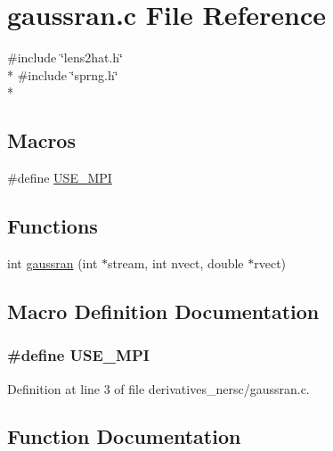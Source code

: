 \section{gaussran.\-c File Reference}
\label{derivatives__nersc_2gaussran_8c}
{\ttfamily \#include \char`\"{}lens2hat.\-h\char`\"{}}\\*
{\ttfamily \#include \char`\"{}sprng.\-h\char`\"{}}\\*
\subsection*{Macros}
\begin{DoxyCompactItemize}
\item 
\#define \hyperlink{derivatives__nersc_2gaussran_8c_a3869d282031f6ea6b50fdb980b758420}{U\-S\-E\-\_\-\-M\-P\-I}
\end{DoxyCompactItemize}
\subsection*{Functions}
\begin{DoxyCompactItemize}
\item 
int \hyperlink{derivatives__nersc_2gaussran_8c_a467c7a00719892a0f87fc03e4c93c2ae}{gaussran} (int $\ast$stream, int nvect, double $\ast$rvect)
\end{DoxyCompactItemize}


\subsection{Macro Definition Documentation}
\subsubsection[{U\-S\-E\-\_\-\-M\-P\-I}]{\setlength{\rightskip}{0pt plus 5cm}\#define U\-S\-E\-\_\-\-M\-P\-I}\label{derivatives__nersc_2gaussran_8c_a3869d282031f6ea6b50fdb980b758420}


Definition at line 3 of file derivatives\-\_\-nersc/gaussran.\-c.



\subsection{Function Documentation}
